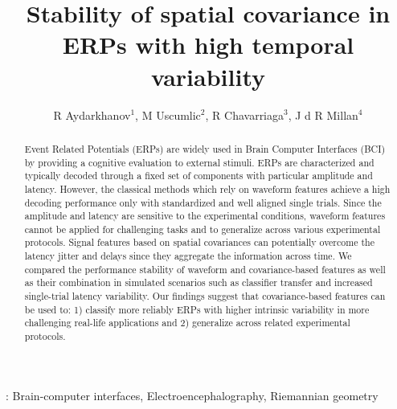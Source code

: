 \documentclass[12pt]{iopart}
\begin{document}
\title[]{Stability of spatial covariance in ERPs with high temporal variability}

\author{R Aydarkhanov$^1$,
M Uscumlic$^2$,
R Chavarriaga$^3$,
J d R Millan$^4$}


\address{$^1$EPFL, Switzerland}
\address{$^2$EPFL, Switzerland}
\address{$^3$EPFL, Switzerland}
\address{$^4$TU Austin, USA}
\vspace{10pt}

\begin{abstract}
Event Related Potentials (ERPs) are widely used in Brain Computer
Interfaces (BCI) by providing a cognitive evaluation to external stimuli.
ERPs are characterized and typically decoded through a fixed set of
components with particular amplitude and latency. 
However, the classical methods which rely on waveform features
achieve a high decoding performance only with standardized
and well aligned single trials. Since the amplitude and latency
are sensitive to the experimental conditions,
waveform features cannot be applied for challenging tasks and
to generalize across various experimental protocols.
Signal features based on spatial covariances can potentially overcome
the latency jitter and delays since they aggregate the information
across time. We compared the performance stability 
of waveform and covariance-based features as well as their combination
in simulated scenarios such as classifier transfer 
and increased single-trial latency variability.
Our findings suggest that covariance-based features
can be used to: 1) classify more reliably ERPs
with higher intrinsic variability in more challenging real-life applications
and 2) generalize across related experimental protocols.
\end{abstract}

%
\vspace{2pc}
: Brain-computer interfaces, Electroencephalography, Riemannian geometry
%
%
% 
%
\end{document}
